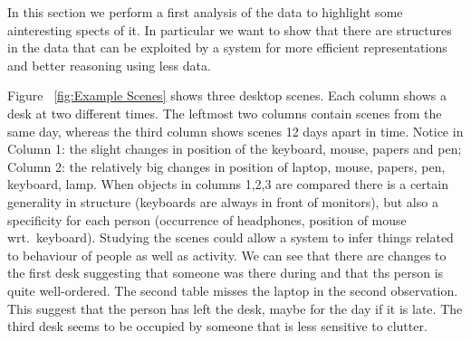 \documentclass[letterpaper, 10 pt, conference]{ieeeconf}  %
\begin{document}
In this section we perform a first analysis of the data to highlight some ainteresting spects of it. In particular we want to show that 
there are structures in the data that can be exploited by a system for more efficient representations and better reasoning using less data.

Figure ~\ref{fig:Example Scenes} shows three desktop scenes. Each column shows a desk at two different times. The leftmost two columns 
contain scenes from the same day, whereas the third column shows scenes 12 days apart in time. Notice in Column 1: the slight changes in 
position of the keyboard, mouse, papers and pen; Column 2: the relatively big changes in position of laptop, mouse, papers, pen, keyboard, 
lamp. When objects in columns 1,2,3 are compared there is a certain generality in structure (keyboards are always in front of monitors), but 
also a specificity for each person (occurrence of headphones, position of mouse wrt.\ keyboard). Studying the scenes could allow a system to 
infer things related to behaviour of people as well as activity. We can see that there are changes to the first desk suggesting that someone 
was there during and that ths person is quite well-ordered. The second table misses the laptop in the second observation. This suggest that 
the person has left the desk, maybe for the day if it is late. The third desk seems to be occupied by someone that is less sensitive to 
clutter.
\end{document}
